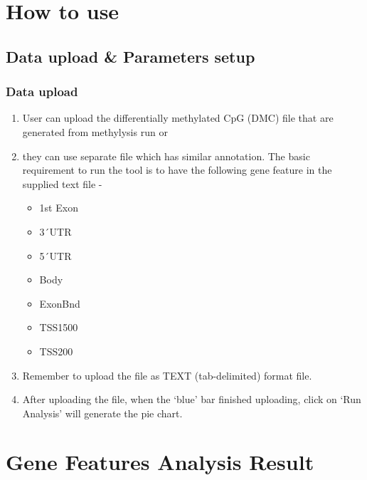 \documentclass[
  a4paper,
  oneside,
  open=any]{scrreport}
\providecommand{\tightlist}{%
  \setlength{\itemsep}{0pt}\setlength{\parskip}{0pt}}\usepackage{longtable,booktabs,array}
\begin{document}
\hypertarget{how-to-use-3}{%
\section{How to use}\label{how-to-use-3}}

\hypertarget{data-upload-parameters-setup-1}{%
\subsection{Data upload \& Parameters
setup}\label{data-upload-parameters-setup-1}}

\hypertarget{data-upload-1}{%
\subsubsection{Data upload}\label{data-upload-1}}

\begin{enumerate}
\def\labelenumi{\arabic{enumi}.}
\tightlist
\item
  User can upload the differentially methylated CpG (DMC) file that are
  generated from methylysis run or
\item
  they can use separate file which has similar annotation. The basic
  requirement to run the tool is to have the following gene feature in
  the supplied text file -

  \begin{itemize}
  \tightlist
  \item
    1st Exon
  \item
    3´UTR
  \item
    5´UTR
  \item
    Body
  \item
    ExonBnd
  \item
    TSS1500
  \item
    TSS200
  \end{itemize}
\item
  Remember to upload the file as TEXT (tab-delimited) format file.
\item
  After uploading the file, when the `blue' bar finished uploading,
  click on `Run Analysis' will generate the pie chart.
\end{enumerate}

\hypertarget{gene-features-analysis-result}{%
\section{Gene Features Analysis
Result}\label{gene-features-analysis-result}}
\end{document}
